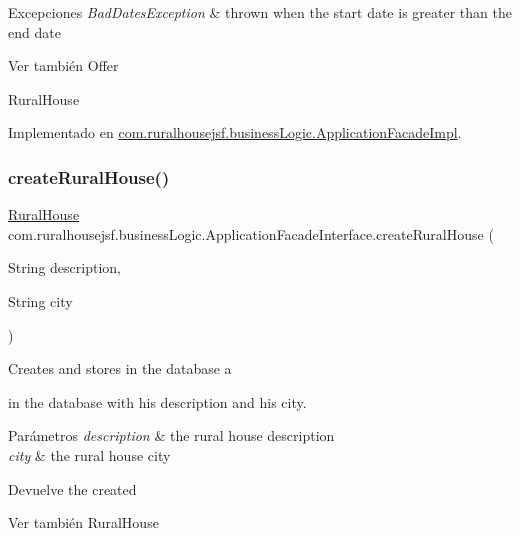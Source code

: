 \begin{DoxyExceptions}{Excepciones}
{\em Bad\+Dates\+Exception} & thrown when the start date is greater than the end date\\
\hline
\end{DoxyExceptions}
\begin{DoxySeeAlso}{Ver también}
Offer 

Rural\+House 
\end{DoxySeeAlso}


Implementado en \mbox{\hyperlink{classcom_1_1ruralhousejsf_1_1business_logic_1_1_application_facade_impl_a9aafb2ac6e91d643bc5dd1f5691d4075}{com.\+ruralhousejsf.\+business\+Logic.\+Application\+Facade\+Impl}}.

\mbox{\label{interfacecom_1_1ruralhousejsf_1_1business_logic_1_1_application_facade_interface_a7fc244cf74494e50a01148496d1b45ad}} 
\subsubsection{\texorpdfstring{createRuralHouse()}{createRuralHouse()}}
{\footnotesize\ttfamily \mbox{\hyperlink{classcom_1_1ruralhousejsf_1_1domain_1_1_rural_house}{Rural\+House}} com.\+ruralhousejsf.\+business\+Logic.\+Application\+Facade\+Interface.\+create\+Rural\+House (\begin{DoxyParamCaption}\item[{String}]{description,  }\item[{String}]{city }\end{DoxyParamCaption})}

Creates and stores in the database a
\begin{DoxyCode}{0}
\end{DoxyCode}
 in the database with his description and his city.


\begin{DoxyParams}{Parámetros}
{\em description} & the rural house description \\
\hline
{\em city} & the rural house city\\
\hline
\end{DoxyParams}
\begin{DoxyReturn}{Devuelve}
the created
\begin{DoxyCode}{0}
\end{DoxyCode}

\end{DoxyReturn}
\begin{DoxySeeAlso}{Ver también}
Rural\+House 
\end{DoxySeeAlso}


